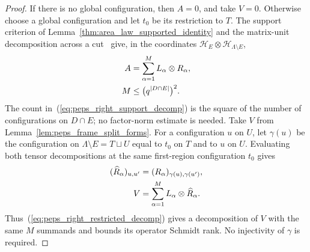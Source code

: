 \begin{proof}\leanok
    If there is no global configuration, then $A=0$, and take $V=0$.
    Otherwise choose a global configuration and let $t_0$ be its restriction
    to $T$. The support criterion of
    Lemma~\ref{thm:area_law_supported_identity} and the matrix-unit
    decomposition across a cut~\cite[``Matrix-unit decomposition across a
        cut'']{QICLean2026Blueprint} give, in the coordinates
    $\mathcal H_E\otimes\mathcal H_{\Lambda\setminus E}$,
    \begin{align}
        A & =\sum_{\alpha=1}^{M}L_\alpha\otimes R_\alpha,\notag                 \\
        M & \le\bigl(q^{|D\cap E|}\bigr)^2.\label{eq:peps_right_support_decomp}
    \end{align}
    The count in~(\ref{eq:peps_right_support_decomp}) is the square of the number of configurations on $D\cap E$;
    no factor-norm estimate is needed.
    Take $V$ from Lemma~\ref{lem:peps_frame_split_forms}.
    For a configuration $u$ on $U$, let $\gamma(u)$ be the configuration
    on $\Lambda\setminus E=T\sqcup U$ equal to $t_0$ on $T$ and to $u$ on $U$.
    Evaluating both tensor decompositions at the same first-region
    configuration $t_0$ gives
    \begin{align}
        (\widehat R_\alpha)_{u,u'}
          & =(R_\alpha)_{\gamma(u),\gamma(u')},\notag                                                    \\
        V & =\sum_{\alpha=1}^{M}L_\alpha\otimes\widehat R_\alpha.\label{eq:peps_right_restricted_decomp}
    \end{align}
    Thus~(\ref{eq:peps_right_restricted_decomp}) gives a decomposition of $V$ with the same $M$ summands and bounds its
    operator Schmidt rank. No injectivity of $\gamma$ is required.
\end{proof}

